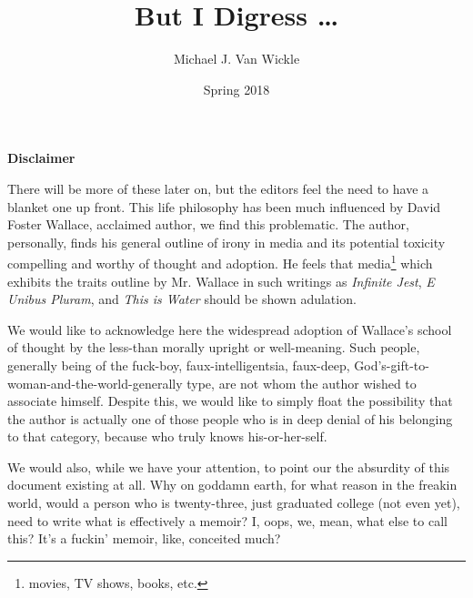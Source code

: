 

\pagecolor{WhiteSmoke}

\title{But I Digress \ldots}
\author{Michael J. Van Wickle}
\date{Spring 2018}


\frontmatter
\pagestyle{empty}

\begin{titlepage}
\customtitlepage
\end{titlepage}

\posttitlepage
\newpage

\renewcommand{\thefootnote}{\fnsymbol{footnote}}
\pagestyle{fancy}
\fancyhf{}
\renewcommand{\chaptermark}[1]{\markboth{#1}{}}
\renewcommand{\sectionmark}[1]{\markright{#1}}
\fancyhead[ER]{\nouppercase{\rightmark}}
\fancyhead[OL]{\nouppercase{\leftmark}}
\fancyfoot[EL,OR]{\thepage}

\setlength{\parskip}{\baselineskip}
\newcommand{\editorsnote}{Disclaimer}
{\centering\bfseries\Large \editorsnote}
\markright{\editorsnote}\addcontentsline{toc}{chapter}{\editorsnote}

\vspace*{\fill}
{\normalsize There will be more of these later on, but the editors feel the need to have a blanket one up front.
This life philosophy has been much influenced by David Foster Wallace, acclaimed author, we find this problematic.
The author, personally, finds his general outline of irony in media and its potential toxicity compelling and worthy of thought and adoption.
He feels that media\footnote{movies, TV shows, books, etc.} which exhibits the traits outline by Mr. Wallace in such writings as \textit{Infinite Jest}\autocite{infjest}, \textit{E Unibus Pluram}, and \textit{This is Water} should be shown adulation.

We would like to acknowledge here the widespread adoption of Wallace's school of thought by the less-than morally upright or well-meaning.\autocite{elonwallace}
Such people, generally being of the fuck-boy, faux-intelligentsia, faux-deep, God's-gift-to-woman-and-the-world-generally type, are not whom the author wished to associate himself.
Despite this, we would like to simply float the possibility that the author is actually one of those people who is in deep denial of his belonging to that category, because who truly knows his-or-her-self.

We would also, while we have your attention, to point our the absurdity of this document existing at all.
Why on goddamn earth, for what reason in the freakin world, would a person who is twenty-three, just graduated college (not even yet), need to write what is effectively a memoir?
I, oops, we, mean, what else to call this?
It's a fuckin' memoir, like, conceited much?}


